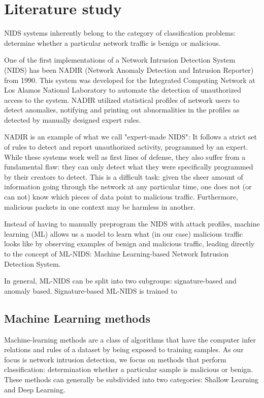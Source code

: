 \section{Literature study}
NIDS systems inherently belong to the category of classification problems: determine whether a particular network traffic is benign or malicious.

One of the first implementations of a Network Intrusion Detection System (NIDS) has been NADIR (Network Anomaly Detection and Intrusion Reporter) \cite{nadir} from 1990. This system was developed for the Integrated Computing Network at Los Alamos National Laboratory to automate the detection of unauthorized access to the system. NADIR utilized statistical profiles of network users to detect anomalies, notifying and printing out abnormalities in the profiles as detected by manually designed expert rules.

NADIR is an example of what we call "expert-made NIDS": It follows a strict set of rules to detect and report unauthorized activity, programmed by an expert. While these systems work well as first lines of defense, they also suffer from a fundamental flaw: they can only detect what they were specifically programmed by their creators to detect. This is a difficult task: given the sheer amount of information going through the network at any particular time, one does not (or can not) know which pieces of data point to malicious traffic. Furthermore, malicious packets in one context may be harmless in another. 

Instead of having to manually preprogram the NIDS with attack profiles, machine learning (ML) allows us a model to learn what (in our case) malicious traffic looks like by observing examples of benign and malicious traffic, leading directly to the concept of ML-NIDS: Machine Learning-based Network Intrusion Detection System.

In general, ML-NIDS can be split into two subgroups: signature-based and anomaly based. Signature-based ML-NIDS is trained to

\subsection{Machine Learning methods}
Machine-learning methods are a class of algorithms that have the computer infer relations and rules of a dataset by being exposed to training samples. As our focus is network intrusion detection, we focus on methods that perform classification: determination whether a particular sample is malicious or benign. These methods can generally be subdivided into two categories: Shallow Learning and Deep Learning. 

